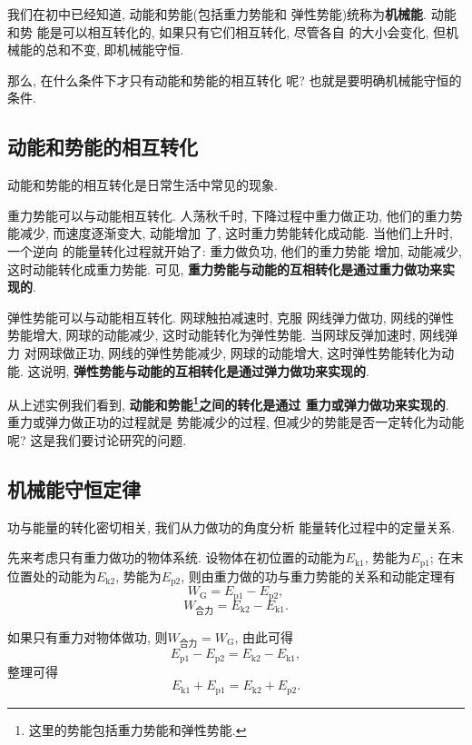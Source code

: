 \documentclass[11pt,a4paper]{ctexbook}
\begin{document}
我们在初中已经知道, 动能和势能(包括重力势能和
弹性势能)统称为\textbf{机械能}. 动能和势
能是可以相互转化的, 如果只有它们相互转化, 尽管各自
的大小会变化, 但机械能的总和不变, 即机械能守恒.

那么, 在什么条件下才只有动能和势能的相互转化
呢? 也就是要明确机械能守恒的条件.

\subsection{动能和势能的相互转化}

动能和势能的相互转化是日常生活中常见的现象.

重力势能可以与动能相互转化. 人荡秋千时,
下降过程中重力做正功,
他们的重力势能减少, 而速度逐渐变大, 动能增加
了, 这时重力势能转化成动能. 当他们上升时, 一个逆向
的能量转化过程就开始了: 重力做负功, 他们的重力势能
增加, 动能减少, 这时动能转化成重力势能. 可见,
\textbf{重力势能与动能的互相转化是通过重力做功来实现的}.

弹性势能可以与动能相互转化. 网球触拍减速时, 克服
网线弹力做功, 网线的弹性势能增大, 网球的动能减少,
这时动能转化为弹性势能. 当网球反弹加速时, 网线弹力
对网球做正功, 网线的弹性势能减少, 网球的动能增大,
这时弹性势能转化为动能. 这说明, \textbf{弹性势能与动能的互相转化是通过弹力做功来实现的}.

从上述实例我们看到, \textbf{动能和势能\footnote{这里的势能包括重力势能和弹性势能.}之间的转化是通过
重力或弹力做功来实现的}. 重力或弹力做正功的过程就是
势能减少的过程, 但减少的势能是否一定转化为动能呢?
这是我们要讨论研究的问题.

\subsection{机械能守恒定律}
功与能量的转化密切相关, 我们从力做功的角度分析
能量转化过程中的定量关系.

先来考虑只有重力做功的物体系统. 设物体在初位置的动能为$E_\mathrm{k1}$, 势能为$E_\mathrm{p1}$;
在末位置处的动能为$E_\mathrm{k2}$, 势能为$E_\mathrm{p2}$, 则由重力做的功与重力势能的关系和动能定理有
$$W_\text{G} = E_\mathrm{p1} - E_\mathrm{p2},$$
$$W_\text{合力} = E_\mathrm{k2} - E_\mathrm{k1}.$$

如果只有重力对物体做功, 则$W_\text{合力} = W_\text{G}$, 由此可得
\begin{equation}
    E_\mathrm{p1} - E_\mathrm{p2} = E_\mathrm{k2} - E_\mathrm{k1},
    \label{机械能守恒定律推导1}
\end{equation}
整理可得\begin{equation}
    E_\mathrm{k1}+E_\mathrm{p1} = E_\mathrm{k2} + E_\mathrm{p2}.
    \label{机械能守恒定律推导2}
\end{equation}
\end{document}
